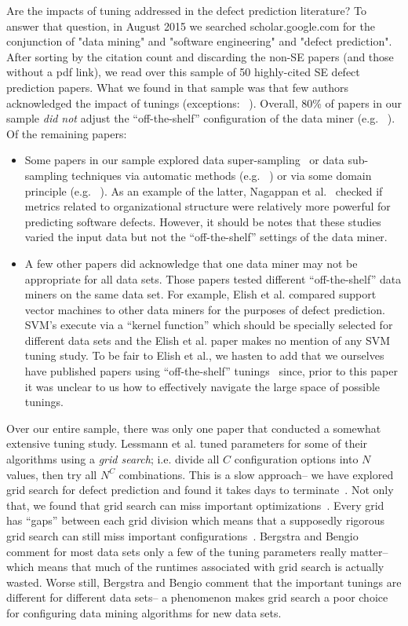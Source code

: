 \documentclass{sig-alternative}
\newcommand{\bi}{\begin{itemize}[leftmargin=0.4cm]}
\newcommand{\ei}{\end{itemize}}
\begin{document}
Are the impacts of tuning addressed in the defect prediction literature?
To answer that question,  in August 2015 we searched scholar.google.com for the conjunction of  "data mining" and "software engineering" and  "defect prediction".
After sorting by the citation count and discarding the non-SE papers (and those without a pdf link), we read over this sample
of  50 highly-cited SE defect prediction papers. 
What we found in that sample was that few authors
acknowledged the impact of tunings (exceptions: ~\cite{hall11,lessmann2008benchmarking}).
Overall,  80\% of papers in our sample {\em did not} adjust
the ``off-the-shelf'' configuration of the data miner (e.g. ~\cite{me07b,Moser:2008,herzig2013predicting,zimmermann2007predicting}). Of the remaining papers:
\bi
\item
Some papers in our sample  explored   data super-sampling~\cite{4271036} or data sub-sampling techniques via  automatic methods (e.g. ~\cite{Gao:2011,me07b,4271036,Kim:2011}) 
or via some domain principle (e.g. ~\cite{Moser:2008,Nagappan:2008,Hassan:2009}).
As an example of the latter, Nagappan et al.~\cite{Nagappan:2008} checked if metrics related to organizational structure were relatively more powerful for predicting software defects. 
However, it should be notes that  these studies varied the input data but
not the   ``off-the-shelf''   settings of the data miner.
\item
A few other papers did acknowledge that one data miner may not be appropriate
for all data sets.  Those papers tested  different  
``off-the-shelf'' data miners on the same data set.
For example, Elish et al.\cite{Elish2008649}  compared support vector
machines to other data miners for the purposes of defect prediction. SVM's execute via a ``kernel function'' which should be specially selected for different data sets and
the Elish et al. paper  makes no mention of any SVM tuning study.  
To be fair to Elish et al., we hasten to add that we
ourselves have  published
papers using ``off-the-shelf'' tunings~\cite{me07b} since,
prior to this paper it was unclear to us how to effectively
navigate the large space of possible tunings.
\ei
Over our entire sample, there was only  one paper that conducted a somewhat extensive tuning study.
Lessmann et al.\cite{lessmann2008benchmarking} tuned parameters for some of their algorithms using  a {\em grid search}; i.e. divide all $C$ configuration
options into $N$ values, then try all   $N^C$ combinations.
This is a slow approach-- we have explored grid search for 
defect prediction and found it takes days to terminate~\cite{me07b}.
Not only that, we found that grid search can miss
important optimizations~\cite{baker07}.
Every grid has ``gaps'' between each grid division which means
that a supposedly rigorous grid search can still miss
important configurations~\cite{Bergstra2012}. 
Bergstra and Bengio~\cite{Bergstra2012} comment for most data sets only a few of the tuning parameters really matter-- which means that
much of the runtimes associated with grid search is actually wasted.
Worse still, Bergstra and Bengio  comment that 
the 
important tunings are   different   for different
data sets-- a 
 phenomenon makes grid search a poor choice for configuring data mining
 algorithms for new data sets. 
 
\end{document}
